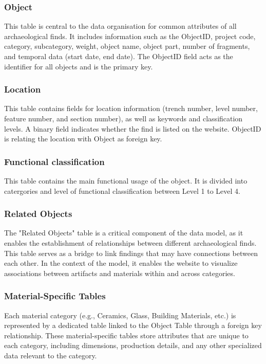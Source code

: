 \subsubsection{Object}
This table is central to the data organisation for common attributes of all archaeological finds. It includes information such as the ObjectID, project code, category, subcategory, weight, object name, object part, number of fragments, and temporal data (start date, end date). The ObjectID field acts as the identifier for all objects and is the primary key.

\subsubsection{Location}
This table contains fields for location information (trench number, level number, feature number, and section number), as well as keywords and classification levels. A binary field indicates whether the find is listed on the website. ObjectID is relating the location with Object as foreign key.

\subsubsection{Functional classification}
This table contains the main functional usage of the object. It is divided into catergories and level of functional classification between Level 1 to Level 4.

\subsubsection{Related Objects}
The "Related Objects" table is a critical component of the data model, as it enables the establishment of relationships between different archaeological finds. This table serves as a bridge to link findings that may have connections between each other. In the context of the model, it enables the website to visualize associations between artifacts and materials within and across categories.

\subsubsection{Material-Specific Tables}
Each material category (e.g., Ceramics, Glass, Building Materials, etc.) is represented by a dedicated table linked to the Object Table through a foreign key relationship. These material-specific tables store attributes that are unique to each category, including dimensions, production details, and any other specialized data relevant to the category.

